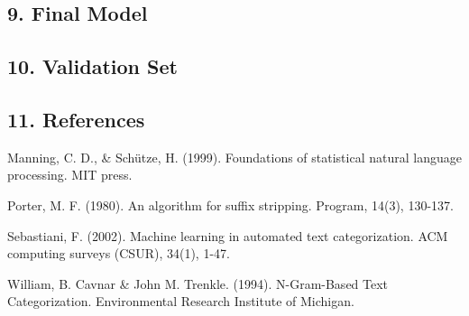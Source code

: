 \documentclass[12pt,]{article}
\begin{document}
\subsection{{9. Final Model}}\label{final-model}

\subsection{{10. Validation Set}}\label{validation-set}

\subsection{{11. References}}\label{references}

Manning, C. D., \& Schütze, H. (1999). Foundations of statistical
natural language processing. MIT press.

Porter, M. F. (1980). An algorithm for suffix stripping. Program, 14(3),
130-137.

Sebastiani, F. (2002). Machine learning in automated text
categorization. ACM computing surveys (CSUR), 34(1), 1-47.

William, B. Cavnar \& John M. Trenkle. (1994). N-Gram-Based Text
Categorization. Environmental Research Institute of Michigan.
\end{document}
